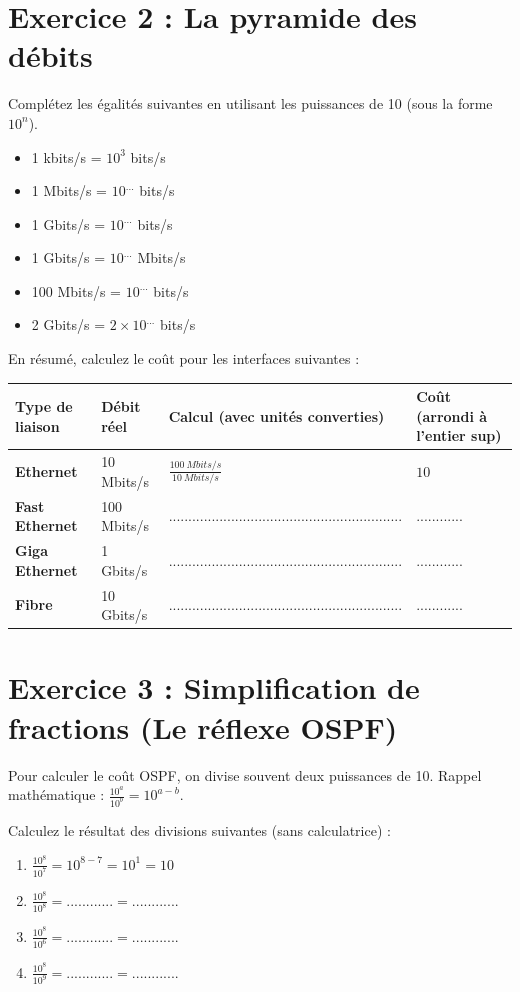 \section*{Exercice 2 : La pyramide des débits}
Complétez les égalités suivantes en utilisant les puissances de 10 (sous la forme $10^n$).
\begin{itemize}
    \item 1 kbits/s = $10^3$ bits/s
    \item  1 Mbits/s = $10^{...}$ bits/s
    \item 1 Gbits/s = $10^{...}$ bits/s
    \item 1 Gbits/s = $10^{...}$ Mbits/s
    \item 100 Mbits/s = $10^{...}$ bits/s
    \item 2 Gbits/s = $2 \times 10^{...}$ bits/s
\end{itemize}
 En résumé, calculez le coût pour les interfaces suivantes :

\begin{table}[!ht]
    \centering
    \begin{tabular}{|l|l|l|l|}
    \hline
        Type de liaison & Débit réel & Calcul (avec unités converties) & Coût (arrondi à l'entier sup) \\ \hline
        \textbf{Ethernet} & 10 Mbits/s & $\frac{100\ Mbits/s}{10\ Mbits/s}$ & $10$\\ \hline
        \textbf{Fast Ethernet} & 100 Mbits/s & ............................................................ & ............ \\ \hline
        \textbf{Giga Ethernet} & 1 Gbits/s & ............................................................ & ............ \\ \hline
        \textbf{Fibre} & 10 Gbits/s & ............................................................ & ............ \\ \hline
    \end{tabular}
\end{table}


\section*{Exercice 3 : Simplification de fractions (Le réflexe OSPF)}
Pour calculer le coût OSPF, on divise souvent deux puissances de 10. Rappel mathématique : $\frac{10^a}{10^b} = 10^{a-b}$.

Calculez le résultat des divisions suivantes (sans calculatrice) :
\begin{enumerate}
    \item $\frac{10^8}{10^7} = 10^{8-7} = 10^1 =10$
    \item  $\frac{10^8}{10^8} = ............ =............$
    \item  $\frac{10^8}{10^6} = ............ = ............$
    \item  $\frac{10^8}{10^9} = ............ = ............$ 
\end{enumerate}
 



